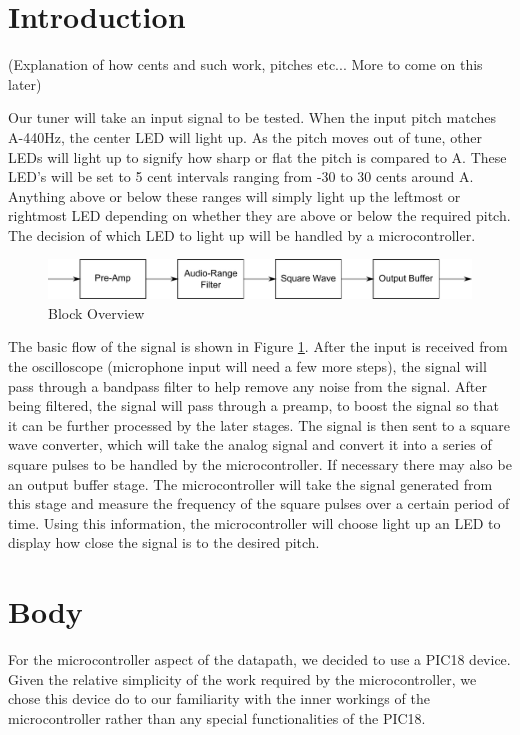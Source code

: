 \documentclass[12pt]{article}
\begin{document}
\newpage
\section{Introduction}

(Explanation of how cents and such work, pitches etc... More to come on this later)

Our tuner will take an input signal to be tested. When the input pitch matches A-440Hz, the
center LED will light up. As the pitch moves out of tune, other LEDs will light up to signify how sharp or
flat the pitch is compared to A. These LED's will be set to 5 cent intervals ranging from -30 to 30 cents
around A. Anything above or below these ranges will simply light up the leftmost or rightmost LED
depending on whether they are above or below the required pitch. The decision of which LED to light up
will be handled by a microcontroller.

\begin{figure}[H]
\centering
	\includegraphics[width=6in]{"Block Overview"}
	\caption{Block Overview}
	\label{block} 
\end{figure}

The basic flow of the signal is shown in Figure \ref{block}. After the input is received from the oscilloscope
(microphone input will need a few more steps), the signal will pass through a bandpass filter to help
remove any noise from the signal. After being filtered, the signal will pass through a preamp, to boost
the signal so that it can be further processed by the later stages. The signal is then sent to a square
wave converter, which will take the analog signal and convert it into a series of square pulses to be
handled by the microcontroller. If necessary there may also be an output buffer stage. The microcontroller
will take the signal generated from this stage and
measure the frequency of the square pulses over a certain period of time. Using this information, the
microcontroller will choose light up an LED to display how close the signal is to the desired pitch.

\section{Body}

For the microcontroller aspect of the datapath, we decided to use a PIC18 device. Given the relative
simplicity of the work required by the microcontroller, we chose this device do to our familiarity with
the inner workings of the microcontroller rather than any special functionalities of the PIC18.
\end{document}
